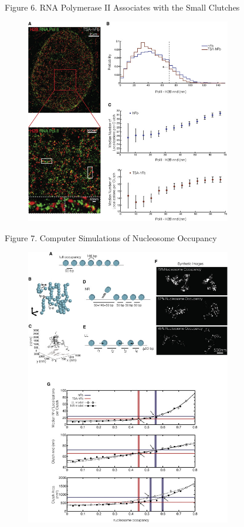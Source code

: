 \documentclass{beamer}			%
\begin{document}
\begin{frame}{Figure 6. RNA Polymerase II Associates with the Small Clutches}
\begin{figure}
\includegraphics[width=9cm]{Figure-6.jpg}
\end{figure}
\end{frame}

\begin{frame}{Figure 7. Computer Simulations of Nucleosome Occupancy}
\begin{figure}
\includegraphics[width=9cm]{Figure-7.jpg}
\end{figure}
\end{frame}
\end{document}
